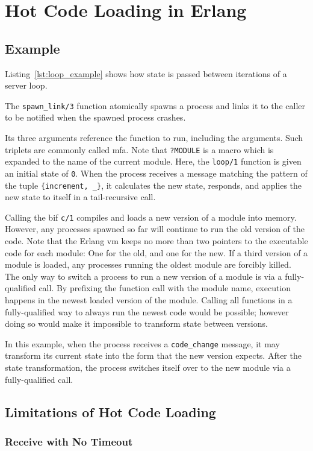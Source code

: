 \chapter{Hot Code Loading in Erlang}

\section{Example}



Listing~\ref{lst:loop_example} shows how state is passed between iterations of a server loop.

The \lstinline{spawn_link/3} function atomically spawns a process and links it to the caller to be notified when the spawned process crashes.

Its three arguments reference the function to run, including the arguments. Such triplets are commonly called \acrfull{mfa}. Note that \lstinline|?MODULE| is a macro which is expanded to the name of the current module. Here, the \lstinline{loop/1} function is given an initial state of \lstinline{0}. When the process receives a message matching the pattern of the tuple \lstinline|{increment, _}|, it calculates the new state, responds, and applies the new state to itself in a tail-recursive call.

Calling the \acrfull{bif} \lstinline|c/1| compiles and loads a new version of a module into memory. However, any processes spawned so far will continue to run the old version of the code. Note that the Erlang \acrshort{vm} keeps no more than two pointers to the executable code for each module: One for the old, and one for the new. If a third version of a module is loaded, any processes running the oldest module are forcibly killed. The only way to switch a process to run a new version of a module is via a fully-qualified call. By prefixing the function call with the module name, execution happens in the newest loaded version of the module. Calling all functions in a fully-qualified way to always run the newest code would be possible; however doing so would make it impossible to transform state between versions.

In this example, when the process receives a \lstinline{code_change} message, it may transform its current state into the form that the new version expects. After the state transformation, the process switches itself over to the new module via a fully-qualified call.

\section{Limitations of Hot Code Loading}

\subsection{Receive with No Timeout}
